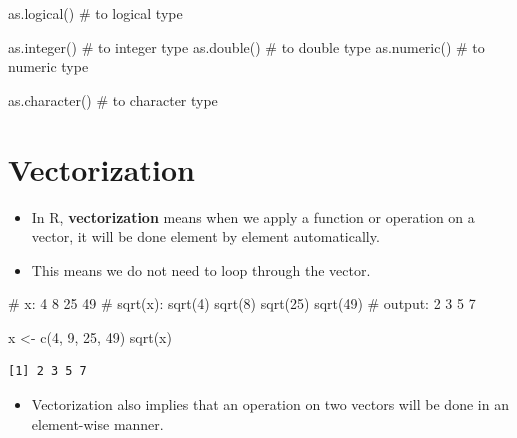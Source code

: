 \documentclass[
  letterpaper,
  DIV=11,
  numbers=noendperiod]{scrreprt}
\newenvironment{Shaded}{\begin{snugshade}}{\end{snugshade}}
\newcommand{\CommentTok}[1]{\textcolor[rgb]{0.37,0.37,0.37}{#1}}
\newcommand{\DecValTok}[1]{\textcolor[rgb]{0.68,0.00,0.00}{#1}}
\newcommand{\FunctionTok}[1]{\textcolor[rgb]{0.28,0.35,0.67}{#1}}
\newcommand{\NormalTok}[1]{\textcolor[rgb]{0.00,0.23,0.31}{#1}}
\newcommand{\OtherTok}[1]{\textcolor[rgb]{0.00,0.23,0.31}{#1}}
\providecommand{\tightlist}{%
  \setlength{\itemsep}{0pt}\setlength{\parskip}{0pt}}\usepackage{longtable,booktabs,array}
\begin{document}
\begin{Shaded}
\begin{Highlighting}[]
\FunctionTok{as.logical}\NormalTok{()      }\CommentTok{\# to logical type}

\FunctionTok{as.integer}\NormalTok{()      }\CommentTok{\# to integer type}
\FunctionTok{as.double}\NormalTok{()       }\CommentTok{\# to double type}
\FunctionTok{as.numeric}\NormalTok{()      }\CommentTok{\# to numeric type}

\FunctionTok{as.character}\NormalTok{()    }\CommentTok{\# to character type}
\end{Highlighting}
\end{Shaded}

\section{Vectorization}\label{vectorization}

\begin{itemize}
\item
  In R, \textbf{vectorization} means when we apply a function or
  operation on a vector, it will be done element by element
  automatically.
\item
  This means we do not need to loop through the vector.
\end{itemize}

\begin{Shaded}
\begin{Highlighting}[]
\CommentTok{\#       x:      4        8         25         49}
\CommentTok{\# sqrt(x): sqrt(4)  sqrt(8)   sqrt(25)   sqrt(49)}
\CommentTok{\#  output:      2        3          5          7}

\NormalTok{x }\OtherTok{\textless{}{-}} \FunctionTok{c}\NormalTok{(}\DecValTok{4}\NormalTok{, }\DecValTok{9}\NormalTok{, }\DecValTok{25}\NormalTok{, }\DecValTok{49}\NormalTok{)}
\FunctionTok{sqrt}\NormalTok{(x)}
\end{Highlighting}
\end{Shaded}

\begin{verbatim}
[1] 2 3 5 7
\end{verbatim}

\begin{itemize}
\tightlist
\item
  Vectorization also implies that an operation on two vectors will be
  done in an element-wise manner.
\end{itemize}
\end{document}
